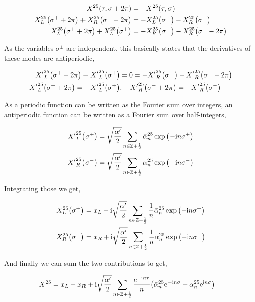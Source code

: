 \begin{align*}
    X^{25}\qty(\tau,\sigma+2\pi)&=-X^{25}\qty(\tau,\sigma)\\
    X_L^{25}\qty(\sigma^++2\pi)+X_R^{25}\qty(\sigma^--2\pi)&=-X_L^{25}\qty(\sigma^+)-X_R^{25}\qty(\sigma^-)\\
    X_L^{25}\qty(\sigma^++2\pi)+X_L^{25}\qty(\sigma^+)&=-X_R^{25}\qty(\sigma^-)-X_R^{25}\qty(\sigma^--2\pi)
\end{align*}

As the variables $\sigma^\pm$ are independent, this basically states that the derivatives of these modes are antiperiodic,

\begin{align*}
    {X'}_L^{25}\qty(\sigma^++2\pi)+{X'}_L^{25}\qty(\sigma^+)&=0=-{X'}_R^{25}\qty(\sigma^-)-{X'}_R^{25}\qty(\sigma^--2\pi)\\
    {X'}_L^{25}\qty(\sigma^++2\pi)=-{X'}_L^{25}\qty(\sigma^+)&,\ \ \ {X'}_R^{25}\qty(\sigma^-+2\pi)=-{X'}_R^{25}\qty(\sigma^-)
\end{align*}

As a periodic function can be written as the Fourier sum over integers, an antiperiodic function can be written as a Fourier sum over half-integers,

\begin{align*}
    {X'}_L^{25}\qty(\sigma^+)&=\sqrt{\frac{\alpha'}{2}}\sum\limits_{n\in\mathbb Z+\frac12}{\bar\alpha}_{n}^{25}\exp\qty(-\textnormal{i} n \sigma^+)\\
    {X'}_R^{25}\qty(\sigma^-)&=\sqrt{\frac{\alpha'}{2}}\sum\limits_{n\in\mathbb Z+\frac12}{\alpha}_{n}^{25}\exp\qty(-\textnormal{i} n \sigma^-)
\end{align*}

Integrating those we get,

\begin{align*}
    {X}_L^{25}\qty(\sigma^+)&=x_L+\textnormal{i}\sqrt{\frac{\alpha'}{2}}\sum\limits_{n\in\mathbb Z+\frac12}\frac1n{\bar\alpha}_{n}^{25}\exp\qty(-\textnormal{i} n \sigma^+)\\
    {X}_R^{25}\qty(\sigma^-)&=x_R+\textnormal{i}\sqrt{\frac{\alpha'}{2}}\sum\limits_{n\in\mathbb Z+\frac12}\frac1n{\alpha}_{n}^{25}\exp\qty(-\textnormal{i} n \sigma^-)
\end{align*}

And finally we can sum the two contributions to get,

\begin{align*}
    X^{25}&=x_L+x_R+\textnormal{i}\sqrt{\frac{\alpha'}{2}}\sum\limits_{n\in\mathbb Z+\frac12}\frac{\textnormal{e}^{-\textnormal{i} n\tau}}{n}\qty({\bar\alpha}_n^{25}\textnormal{e}^{-\textnormal{i} n\sigma}+\alpha_n^{25}\textnormal{e}^{\textnormal{i} n\sigma})
\end{align*}

